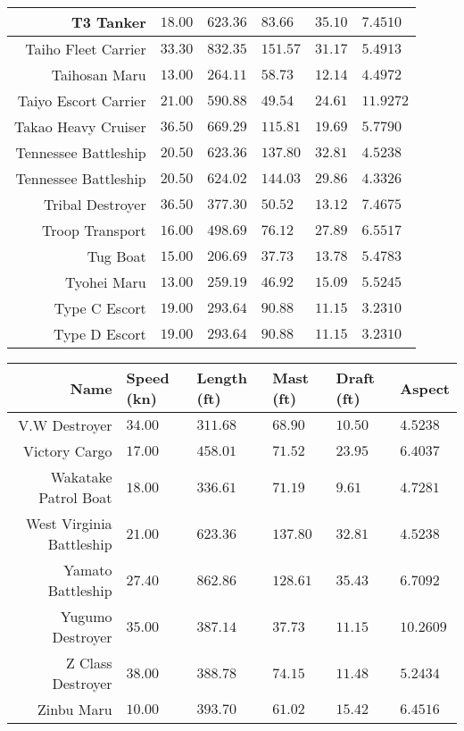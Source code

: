 \documentclass{article}
\begin{document}
\begin{tabularx}{\textwidth}{|r|l|l|l|l|X|}
\hline
T3 Tanker & $18.00$ & $623.36$ & $83.66$ & $35.10$ & $7.4510$ \\
\hline
Taiho Fleet Carrier & $33.30$ & $832.35$ & $151.57$ & $31.17$ & $5.4913$ \\
\hline
Taihosan Maru & $13.00$ & $264.11$ & $58.73$ & $12.14$ & $4.4972$ \\
\hline
Taiyo Escort Carrier & $21.00$ & $590.88$ & $49.54$ & $24.61$ & $11.9272$ \\
\hline
Takao Heavy Cruiser & $36.50$ & $669.29$ & $115.81$ & $19.69$ & $5.7790$ \\
\hline
Tennessee Battleship & $20.50$ & $623.36$ & $137.80$ & $32.81$ & $4.5238$ \\
\hline
Tennessee Battleship & $20.50$ & $624.02$ & $144.03$ & $29.86$ & $4.3326$ \\
\hline
Tribal Destroyer & $36.50$ & $377.30$ & $50.52$ & $13.12$ & $7.4675$ \\
\hline
Troop Transport & $16.00$ & $498.69$ & $76.12$ & $27.89$ & $6.5517$ \\
\hline
Tug Boat & $15.00$ & $206.69$ & $37.73$ & $13.78$ & $5.4783$ \\
\hline
Tyohei Maru & $13.00$ & $259.19$ & $46.92$ & $15.09$ & $5.5245$ \\
\hline
Type C Escort & $19.00$ & $293.64$ & $90.88$ & $11.15$ & $3.2310$ \\
\hline
Type D Escort & $19.00$ & $293.64$ & $90.88$ & $11.15$ & $3.2310$ \\
\hline
\end{tabularx}
\pagebreak

\pagebreak
\begin{tabularx}{\textwidth}{|r|l|l|l|l|X|}
\hline
\textbf{Name} & \textbf{Speed (kn)} & \textbf{Length (ft)} & \textbf{Mast (ft)} & \textbf{Draft (ft)} & \textbf{Aspect}\\
\hline
V.W Destroyer & $34.00$ & $311.68$ & $68.90$ & $10.50$ & $4.5238$ \\
\hline
Victory Cargo & $17.00$ & $458.01$ & $71.52$ & $23.95$ & $6.4037$ \\
\hline
Wakatake Patrol Boat & $18.00$ & $336.61$ & $71.19$ & $9.61$ & $4.7281$ \\
\hline
West Virginia Battleship & $21.00$ & $623.36$ & $137.80$ & $32.81$ & $4.5238$ \\
\hline
Yamato Battleship & $27.40$ & $862.86$ & $128.61$ & $35.43$ & $6.7092$ \\
\hline
Yugumo Destroyer & $35.00$ & $387.14$ & $37.73$ & $11.15$ & $10.2609$ \\
\hline
Z Class Destroyer & $38.00$ & $388.78$ & $74.15$ & $11.48$ & $5.2434$ \\
\hline
Zinbu Maru & $10.00$ & $393.70$ & $61.02$ & $15.42$ & $6.4516$ \\
\hline
\end{tabularx}
\pagebreak
\end{document}
